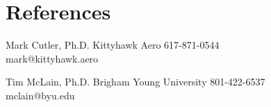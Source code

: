 

\section{References}

\begin{entrylist}
\entry
  {}
  {Mark Cutler, Ph.D.}
  {Kittyhawk Aero}
  {
  	617-871-0544 \\
  	mark@kittyhawk.aero
  }
\end{entrylist}

\begin{entrylist}
\entry
  {}
  {Tim McLain, Ph.D.}
  {Brigham Young University}
  {
  	801-422-6537 \\
  	mclain@byu.edu
  }
\end{entrylist}

